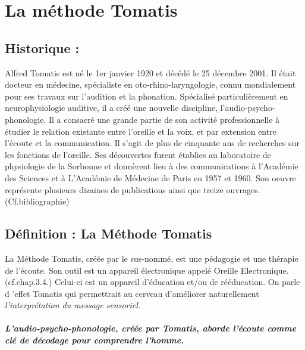 \chapter{La méthode Tomatis}

\section{Historique :}

Alfred Tomatis est né le 1er janvier 1920 et décédé le 25 décembre
2001. Il était docteur en médecine, spécialiste en oto-rhino-laryngologie,
connu mondialement pour ses travaux sur l'audition et la phonation.
Spécialisé particulièrement en neurophysiologie auditive, il a créé
une nouvelle discipline, l'audio-psycho-phonologie. Il a consacré
une grande partie de son activité professionnelle à étudier le relation
existante entre l'oreille et la voix, et par extension entre l'écoute
et la communication. Il s'agit de plus de cinquante ans de recherches
sur les fonctions de l'oreille. Ses découvertes furent établies au
laboratoire de physiologie de la Sorbonne et donnèrent lieu à des
communications à l'Académie des Sciences et à L'Académie de Médecine
de Paris en 1957 et 1960. Son oeuvre représente plusieurs dizaines
de publications ainsi que treize ouvrages. (Cf.bibliographie)

\section{Définition : La Méthode Tomatis}

La Méthode Tomatis, créée par le sus-nommé, est une pédagogie et une
thérapie de l'écoute. Son outil est un appareil électronique appelé
Oreille Electronique. (cf.chap.3.4.) Celui-ci est un appareil d'éducation
et/ou de rééducation. On parle d 'effet Tomatis qui permettrait au
cerveau d'améliorer naturellement \emph{l'interprétation du message
sensoriel.}

\paragraph{L'audio-psycho-phonologie, créée par Tomatis, aborde l'écoute comme
clé de décodage pour comprendre l'homme.}

